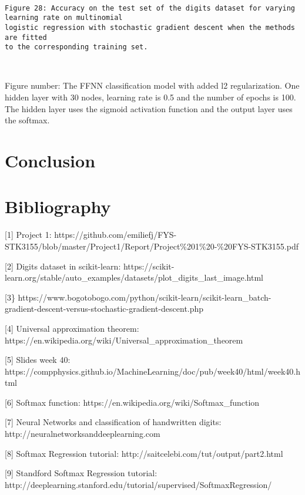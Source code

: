 \documentclass[11pt]{article}
\begin{document}
    \begin{center}
    \end{center}
    { \hspace*{\fill} \\}
 

    \begin{Verbatim}[commandchars=\\\{\}]
Figure 28: Accuracy on the test set of the digits dataset for varying
learning rate on multinomial
logistic regression with stochastic gradient descent when the methods are fitted
to the corresponding training set.
    \end{Verbatim}



    \begin{center}
    \end{center}
    { \hspace*{\fill} \\}
    
    Figure number: The FFNN classification model with added l2
regularization. One hidden layer with 30 nodes, learning rate is 0.5 and
the number of epochs is 100. The hidden layer uses the sigmoid
activation function and the output layer uses the softmax.

    \hypertarget{conclusion}{%
\section{Conclusion}\label{conclusion}}


    \hypertarget{bibliography}{%
\section{Bibliography}\label{bibliography}}

{[}1{]} Project 1:
https://github.com/emiliefj/FYS-STK3155/blob/master/Project1/Report/Project\%201\%20-\%20FYS-STK3155.pdf

{[}2{]} Digits dataset in scikit-learn:
https://scikit-learn.org/stable/auto\_examples/datasets/plot\_digits\_last\_image.html

{[}3\}
https://www.bogotobogo.com/python/scikit-learn/scikit-learn\_batch-gradient-descent-versus-stochastic-gradient-descent.php

{[}4{]} Universal approximation theorem:
https://en.wikipedia.org/wiki/Universal\_approximation\_theorem

{[}5{]} Slides week 40:
https://compphysics.github.io/MachineLearning/doc/pub/week40/html/week40.html

{[}6{]} Softmax function:
https://en.wikipedia.org/wiki/Softmax\_function

{[}7{]} Neural Networks and classification of handwritten digits:
http://neuralnetworksanddeeplearning.com

{[}8{]} Softmax Regression tutorial:
http://saitcelebi.com/tut/output/part2.html

{[}9{]} Standford Softmax Regression tutorial:
http://deeplearning.stanford.edu/tutorial/supervised/SoftmaxRegression/
    
    
    
\end{document}
